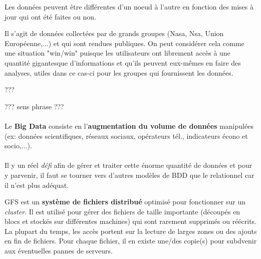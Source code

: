 \item{}
{\faux}
{Les données peuvent être différentes d'un noeud à l'autre en fonction des mises à jour qui ont été faites ou non.}


\item{}
{\vrai}
{Il s'agit de données collectées par de grands groupes (Nasa, Nsa, Union Européenne,...) et qui sont rendues publiques. On peut considérer cela comme une situation "win/win" puisque les utilisateurs ont librement accès à une quantité gigantesque d'informations et qu'ils peuvent eux-mêmes en faire des analyses, utiles dans ce cas-ci pour les groupes qui fournissent les données.}


\item{}
{???}
{??? sens phrase ???

\paragraph{}
Le \textbf{Big Data} consiste en l'\textbf{augmentation du volume de données} manipulées (ex: données scientifiques, réseaux sociaux, opérateurs tél., indicateurs écono et socio,...).

\paragraph{}Il y un réel \textit{défi} afin de gérer et traiter cette énorme quantité de données et pour y parvenir, il faut se tourner vers d'autres modèles de BDD que le relationnel car il n'est plus adéquat.
}


\item{}
{\vrai}
{GFS est un \textbf{système de fichiers distribué} optimisé pour fonctionner sur un \textit{cluster}. Il est utilisé pour gérer des fichiers de taille importante (découpés en blocs et stockés sur différentes machines) qui sont rarement supprimés ou réécrits. La plupart du temps, les accès portent sur la lecture de larges zones ou des ajouts en fin de fichiers. Pour chaque fichier, il en existe une/des copie(s) pour subdvenir aux éventuelles pannes de serveurs.}


